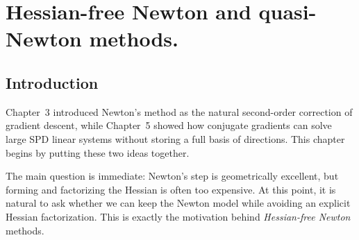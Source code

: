 \chapter{Hessian-free Newton and quasi-Newton methods.}

\graphicspath{{chapters/06_quasi_newton_methods/figures}}
\begin{abstract}
This chapter proceeds in two stages. We first combine the
Newton viewpoint from Chapter~3 with the conjugate-gradient machinery from
Chapter~5 to obtain Hessian-free Newton methods, also called inexact Newton,
Newton--CG, or truncated-CG methods. We then turn to quasi-Newton ideas:
secant equations, the curvature condition, SR1, BFGS, and the limited-memory
variant L-BFGS.
\end{abstract}


\section{Introduction}
Chapter~3 introduced Newton's method as the natural second-order correction of
gradient descent, while Chapter~5 showed how conjugate gradients can solve
large SPD linear systems without storing a full basis of directions. This
chapter begins by putting these two ideas together.

The main question is immediate: Newton's step is geometrically excellent, but
forming and factorizing the Hessian is often too expensive. At this point, it
is natural to ask whether we can keep the Newton model while avoiding an
explicit Hessian factorization. This is exactly the motivation behind
\emph{Hessian-free Newton} methods.

